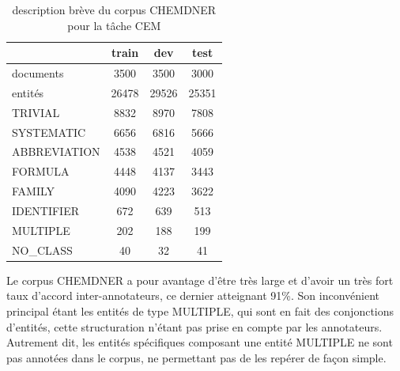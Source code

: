 \documentclass[PhD-Yoann-Dupont.tex]{subfiles}
\begin{document}

\begin{table}[ht!]
\centering
\begin{tabular}{|l|c|c|c|}
\cline{2-4}
\multicolumn{1}{c|}{} & train & dev   & test   \\
\hline
documents             & 3500  & 3500  & 3000   \\
entités               & 26478 & 29526 & 25351  \\
\hline
TRIVIAL               & 8832  & 8970  & 7808   \\
SYSTEMATIC            & 6656  & 6816  & 5666   \\
ABBREVIATION          & 4538  & 4521  & 4059   \\
FORMULA               & 4448  & 4137  & 3443   \\
FAMILY                & 4090  & 4223  & 3622   \\
IDENTIFIER            & 672   & 639   & 513    \\
MULTIPLE              & 202   & 188   & 199    \\
NO\_CLASS             & 40    & 32    & 41     \\
\hline
\end{tabular}
\caption{description brève du corpus CHEMDNER pour la tâche CEM}
\label{tab:chemdner-splits-numbers}
\end{table}

Le corpus CHEMDNER a pour avantage d'être très large et d'avoir un très fort taux d'accord inter-annotateurs, ce dernier atteignant 91\%. Son inconvénient principal étant les entités de type MULTIPLE, qui sont en fait des conjonctions d'entités, cette structuration n'étant pas prise en compte par les annotateurs. Autrement dit, les entités spécifiques composant une entité MULTIPLE ne sont pas annotées dans le corpus, ne permettant pas de les repérer de façon simple.
\end{document}
